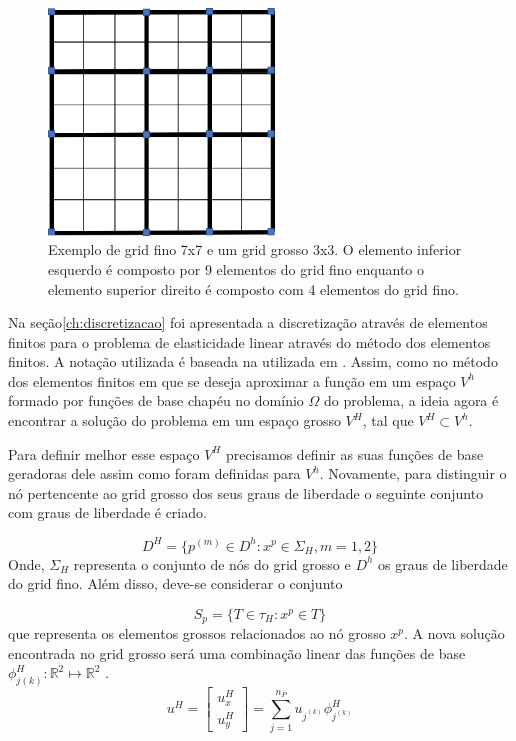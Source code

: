 \documentclass{article}
\begin{document}
\begin{figure}[!htbp]
\label{fig:gridgrosso}
\centering
\includegraphics[width=6cm]{figs/grosso.png}
\caption{Exemplo de grid fino 7x7 e um grid grosso 3x3. O elemento inferior esquerdo é composto por 9 elementos do grid fino enquanto o elemento superior direito é composto com 4 elementos do grid fino.}
\end{figure}


Na seção\ref{ch:discretizacao} foi apresentada a discretização através de elementos finitos para o problema de elasticidade linear através do método dos elementos finitos. A notação utilizada é baseada na utilizada em \cite{mbuck}. Assim, como no método dos elementos finitos em que se deseja aproximar a função em um espaço $V^h$ formado por funções de base chapéu no domínio $\Omega$ do problema, a ideia agora é encontrar a solução do problema em um espaço grosso $V^{H}$, tal que $V^{H} \subset V^h$. 



Para definir melhor esse espaço $V^{H}$ precisamos definir as suas funções de base geradoras dele assim como foram definidas para $V^h$.  Novamente, para distinguir o nó pertencente ao grid grosso dos seus graus de liberdade o seguinte conjunto com graus de liberdade é criado.


\begin{equation}
    D^H = \{ p^{(m)} \in D^h : x^p \in \Sigma_H, m=1,2\}
\end{equation}
Onde, \(\Sigma_H\) representa o conjunto de nós do grid grosso e \(D^h\) os graus de liberdade do grid fino. Além disso, deve-se considerar o conjunto

\begin{equation}
    S_p = \{T \in \tau_H : x^p \in T\}
\end{equation}que representa os elementos grossos relacionados ao nó grosso $x^p $. A nova solução encontrada no grid grosso será uma combinação linear das funções de base $\phi_{j{(k)}}^H : \mathbb{R}^2 \mapsto \mathbb{R}^2 $  .
\begin{equation}
u^H = 
\begin{bmatrix}
u^H_x
\\ 
u^H_y
\end{bmatrix}
= \sum_{j=1}^{n_P} u_{j^{(k)}} \phi^H_{j^{(k)}}
\end{equation}
\end{document}
